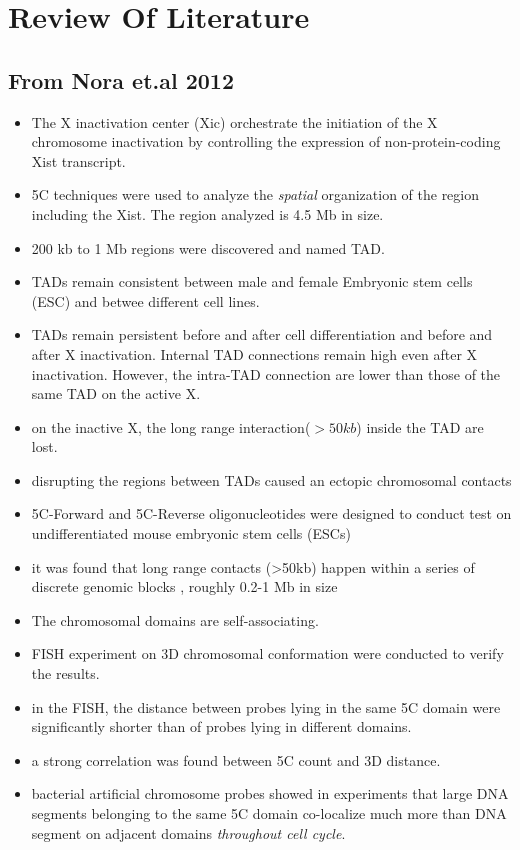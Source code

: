 \documentclass[12pt]{paper}
\begin{document}
\section{Review Of Literature}

\subsection{From Nora et.al 2012 \cite{nora2012spatial}}
\begin{itemize}
\item The X inactivation center (Xic) orchestrate the initiation of the X chromosome inactivation by controlling the expression of non-protein-coding Xist transcript. 
\item 5C techniques were  used to analyze the \textit{spatial} organization of the region including the Xist. The region analyzed  is 4.5 Mb in size. 
\item 200 kb to 1 Mb regions were discovered and named TAD.
\item TADs remain consistent between male and female Embryonic stem cells (ESC) and betwee different cell lines.
\item TADs remain persistent before and after cell differentiation and before and after X inactivation. Internal TAD connections remain high even after X inactivation. However, the intra-TAD connection are lower than those of the same TAD on the active X.
\item on the inactive X, the long range interaction($>50kb$) inside the TAD are lost. 
\item disrupting the regions between TADs caused an ectopic chromosomal contacts 
\item 5C-Forward and 5C-Reverse oligonucleotides were designed to conduct test on undifferentiated mouse embryonic stem cells (ESCs)
\item it was found that long range contacts (>50kb) happen within a series of discrete genomic blocks , roughly 0.2-1 Mb in size 
\item The chromosomal domains are self-associating. 
\item FISH experiment on 3D chromosomal conformation were conducted to verify the results.
\item in the FISH, the distance between probes lying in the same 5C domain were significantly shorter than of probes lying in different domains. 
\item a strong correlation was found between 5C count and 3D distance. 
\item bacterial artificial chromosome probes showed in experiments that large DNA segments belonging to the same 5C domain co-localize much more than DNA segment on adjacent domains \textit{throughout cell cycle}. 

\end{itemize}
\end{document}
